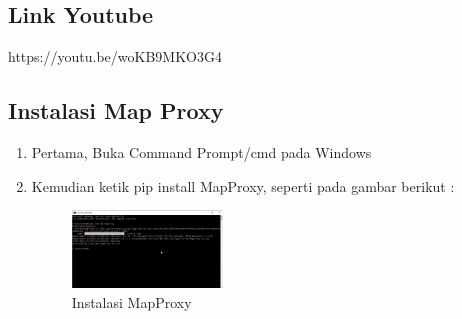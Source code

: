 \subsection{Link Youtube}
https://youtu.be/woKB9MKO3G4
\subsection{Instalasi Map Proxy}
\begin{enumerate}
  \item Pertama, Buka Command Prompt/cmd pada Windows
  \item Kemudian ketik pip install MapProxy, seperti pada gambar berikut :
  \hfill\break
  \begin{figure}[H]
  \includegraphics[width=4cm]{figures/tugas4/1174053/25.png}
  \centering
  \caption{Instalasi MapProxy}
  \end{figure}
\end{enumerate}
